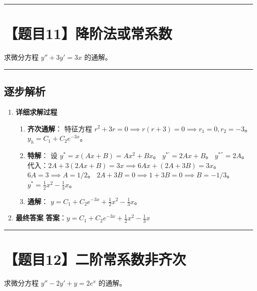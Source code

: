 \documentclass[UTF8]{ctexart}
\newenvironment{redenv}{\color{red}}{}
\newenvironment{detailedanalysis}{%
    \color{red}
    \begin{enumerate}[label=\textbf{第\arabic*步：}, leftmargin=*, align=left, itemsep=1.5ex]
}{%
    \end{enumerate}
}
\newcommand{\problemrule}{\noindent\rule{\textwidth}{1.5pt}\vspace{-0.8em}}
\newcommand{\analysisrule}{\noindent\rule{\textwidth}{0.8pt}\vspace{-0.8em}}
\begin{document}
\problemrule
\section*{【题目11】降阶法或常系数}
求微分方程 $ y'' + 3y' = 3x $ 的通解。

\begin{redenv}
\analysisrule
\subsection*{逐步解析}

\begin{detailedanalysis}
\item \textbf{详细求解过程}
\begin{enumerate}[label=(\arabic*)]
\item \textbf{齐次通解}：
特征方程 $r^2 + 3r = 0 \implies r(r+3)=0 \implies r_1=0, r_2=-3$。
$y_h = C_1 + C_2 e^{-3x}$。
\item \textbf{特解}：
设 $y^* = x(Ax+B) = Ax^2 + Bx$。
$y^{*'} = 2Ax + B$。
$y^{*''} = 2A$。
代入：$2A + 3(2Ax+B) = 3x \implies 6Ax + (2A+3B) = 3x$。
$6A = 3 \implies A = 1/2$。
$2A + 3B = 0 \implies 1 + 3B = 0 \implies B = -1/3$。
$y^* = \frac{1}{2}x^2 - \frac{1}{3}x$。
\item \textbf{通解}：
$y = C_1 + C_2 e^{-3x} + \frac{1}{2}x^2 - \frac{1}{3}x$。
\end{enumerate}

\item \textbf{最终答案}
\textbf{答案}：$ y = C_1 + C_2 e^{-3x} + \frac{1}{2}x^2 - \frac{1}{3}x $
\end{detailedanalysis}
\end{redenv}

\problemrule
\section*{【题目12】二阶常系数非齐次}
求微分方程 $ y''-2y'+y=2e^{x} $ 的通解。
\end{document}
